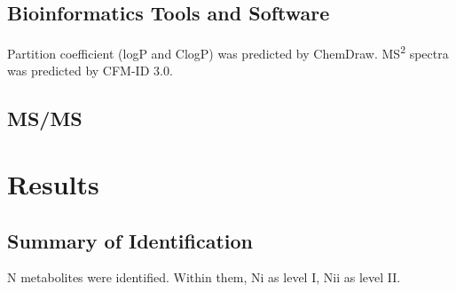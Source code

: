 	\subsection{Bioinformatics Tools and Software}
	Partition coefficient (logP and ClogP) was predicted by ChemDraw. 
	MS\textsuperscript{2} spectra was predicted by CFM-ID 3.0\cite{metabo9040072}.
	
	\subsection{MS/MS}
	
	
\section{Results}
\subsection{Summary of Identification}
N metabolites were identified. Within them, Ni as level I, Nii as level II. 
